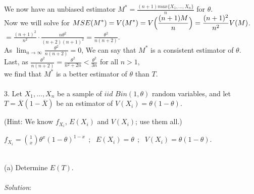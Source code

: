 \documentclass[12pt]{article}
\newcommand{\XB}{\color{black}}
\newcommand{\XBB}{\color{blue}}
\begin{document}
\noindent
We now have an unbiased estimator $ \displaystyle M^{*} = \frac{(n + 1)max\{X_{1},...,X_{n}\}}{n} $ for $ \theta $. \\

\noindent
Now we will solve for $ \displaystyle MSE(M^{*}) = V(M^{*}) = V\Bigl( \frac{(n + 1)M}{n} \Bigr) = \frac{(n + 1)^{2}}{n^{2}} V(M) $. \\

$ \displaystyle = \frac{(n + 1)^{2}}{n^{2}} \cdot \frac{n\theta^{2}}{(n + 2)(n + 1)^{2}} = \frac{\theta^{2}}{n(n + 2)} $. \\

\noindent
As $ \displaystyle \lim_{n \to \infty} \frac{\theta^{2}}{n(n + 2)} = 0 $, We can say that $ M^{*} $ is a consistent estimator of $ \theta $. \\

Last, as $ \displaystyle \frac{\theta^{2}}{n(n + 2)} = \frac{\theta^{2}}{n^{2} + 2n} < \frac{\theta^{2}}{3n} $ for all $ n > 1 $, \\

we find that $ M^{*} $ is a better estimator of $ \theta $ than $ T $. \\

\newpage
\XBB\hrulefill\XB \\

3. Let $ X_{1}, \dots, X_{n} $ be a sample of $ iid $ $ Bin(1, \theta) $ random variables, and let $ T = \overline{X}(1 - \overline{X}) $ be an estimator of $ V(X_{i}) = \theta(1 - \theta) $. 

(Hint: We know $ f_{X_{i}} $, $ E(X_{i}) $ and $ V(X_{i}) $; use them all.) \\

\begin{center}
    $ \displaystyle f_{X_{i}} = \binom{1}{x} \theta^{x}(1 - \theta)^{1-x} \ \ $; 
    $ \ \ E(X_{i}) =  \theta \ \ $; 
    $ \ \ V(X_{i}) =  \theta(1 - \theta) $. 
\end{center}

\XBB\hrulefill\XB 
\vspace{5mm} \\

(a) Determine $ E(T) $. \\
\vspace{2.5mm} \\
\textit{Solution}:
\vspace{2.5mm} \\
\end{document}
